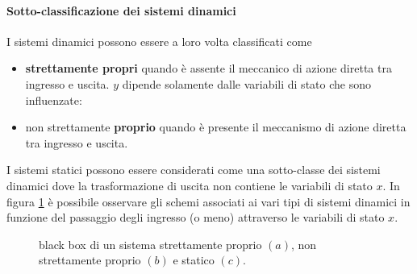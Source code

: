  	
 	\paragraph{Sotto-classificazione dei sistemi dinamici} I sistemi dinamici possono essere a loro volta classificati come
 	\begin{itemize}
 		\item \textbf{strettamente propri} quando è assente il meccanico di azione diretta tra ingresso e uscita. $y$ dipende solamente dalle variabili di stato che sono influenzate:
 		\item non strettamente \textbf{proprio} quando è presente il meccanismo di azione diretta tra ingresso e uscita.
 	\end{itemize}
 	I sistemi statici possono essere considerati come una sotto-classe dei sistemi dinamici dove la trasformazione di uscita non contiene le variabili di stato $x$. In figura \ref{fig:classificazionesistemi} è possibile osservare gli schemi associati ai vari tipi di sistemi dinamici in funzione del passaggio degli ingresso (o meno) attraverso le variabili di stato $x$.
 	
 	\begin{figure}[bht]
 		\centering
 		\begin{subfigure}{0.3\linewidth}
 			\centering
 			 \caption{}
 		\end{subfigure}
	 	\begin{subfigure}{0.3\linewidth}
		 	\centering
		 	 \caption{}
		 \end{subfigure}
		 \begin{subfigure}{0.3\linewidth}
			 \centering
			  \caption{}
		 \end{subfigure}
	 	\caption{black box di un sistema strettamente proprio $(a)$, non strettamente proprio $(b)$ e statico $(c)$.} 
	 	\label{fig:classificazionesistemi}
 	\end{figure}
 	
